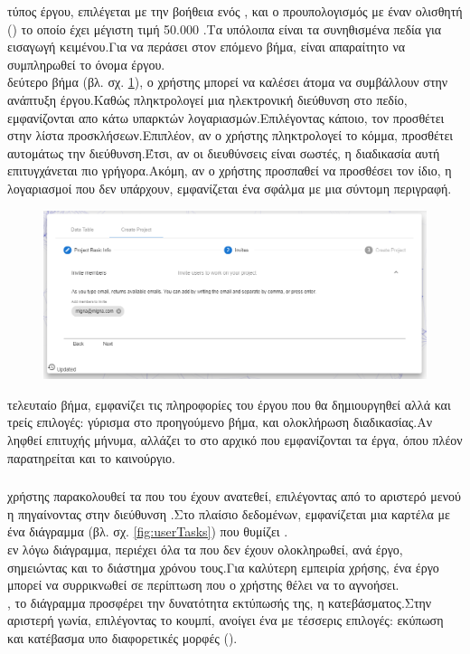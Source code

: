  τύπος έργου, επιλέγεται με την βοήθεια ενός , και ο προυπολογισμός με έναν ολισθητή () το οποίο έχει μέγιστη τιμή 50.000 .Τα υπόλοιπα είναι τα συνηθισμένα πεδία για εισαγωγή κειμένου.Για να περάσει στον επόμενο βήμα, είναι απαραίτητο να συμπληρωθεί το όνομα έργου.\\

 δεύτερο βήμα (βλ. σχ. \ref{fig:userCreateProject2}), ο χρήστης μπορεί να καλέσει άτομα να συμβάλλουν στην ανάπτυξη έργου.Καθώς πληκτρολογεί μια ηλεκτρονική διεύθυνση στο πεδίο, εμφανίζονται απο κάτω  υπαρκτών λογαριασμών.Επιλέγοντας κάποιο, τον προσθέτει στην λίστα προσκλήσεων.Επιπλέον, αν ο χρήστης πληκτρολογεί το κόμμα, προσθέτει αυτομάτως την διεύθυνση.Έτσι, αν οι διευθύνσεις είναι σωστές, η διαδικασία αυτή επιτυγχάνεται πιο γρήγορα.Ακόμη, αν ο χρήστης προσπαθεί να προσθέσει τον ίδιο, η λογαριασμοί που δεν υπάρχουν, εμφανίζεται ένα σφάλμα με μια σύντομη περιγραφή.

\begin{figure}[!htb]
\includegraphics[width=\columnwidth, scale=4]{images/userCreateProject2.png}
\caption{}
\label{fig:userCreateProject2}
\end{figure}

 τελευταίο βήμα, εμφανίζει τις πληροφορίες του έργου που θα δημιουργηθεί αλλά και τρείς επιλογές: γύρισμα στο προηγούμενο βήμα,  και ολοκλήρωση διαδικασίας.Αν ληφθεί επιτυχής μήνυμα, αλλάζει το  στο αρχικό που εμφανίζονται τα έργα, όπου πλέον παρατηρείται και το καινούργιο.

\subsubsection*{}
 χρήστης παρακολουθεί τα  που του έχουν ανατεθεί, επιλέγοντας  από το αριστερό μενού η πηγαίνοντας στην διεύθυνση .Στο πλαίσιο δεδομένων, εμφανίζεται μια καρτέλα με ένα διάγραμμα (βλ. σχ. \ref{fig:userTasks}) που θυμίζει .\\
 εν λόγω διάγραμμα, περιέχει όλα τα  που δεν έχουν ολοκληρωθεί, ανά έργο, σημειώντας και το διάστημα χρόνου τους.Για καλύτερη εμπειρία χρήσης, ένα έργο μπορεί να συρρικνωθεί σε περίπτωση που ο χρήστης θέλει να το αγνοήσει.\\
, το διάγραμμα προσφέρει την δυνατότητα εκτύπωσής της, η κατεβάσματος.Στην αριστερή γωνία, επιλέγοντας το κουμπί, ανοίγει ένα  με τέσσερις επιλογές: εκύπωση και κατέβασμα υπο διαφορετικές μορφές ().

